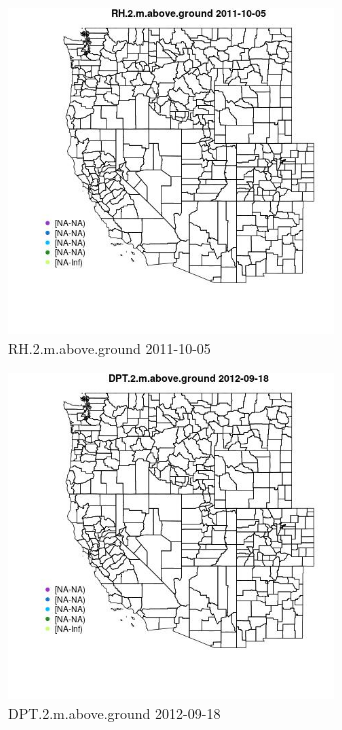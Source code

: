 \begin{figure} 
\centering  
\includegraphics[width=0.77\textwidth]{Code_Outputs/ML_input_report_ML_input_PM25_Step5_part_d_de_duplicated_aves_ML_input_MapObsRH2maboveground2011-10-05.jpg} 
\caption{\label{fig:ML_input_report_ML_input_PM25_Step5_part_d_de_duplicated_aves_ML_inputMapObsRH2maboveground2011-10-05}RH.2.m.above.ground 2011-10-05} 
\end{figure} 
 

\begin{figure} 
\centering  
\includegraphics[width=0.77\textwidth]{Code_Outputs/ML_input_report_ML_input_PM25_Step5_part_d_de_duplicated_aves_ML_input_MapObsDPT2maboveground2012-09-18.jpg} 
\caption{\label{fig:ML_input_report_ML_input_PM25_Step5_part_d_de_duplicated_aves_ML_inputMapObsDPT2maboveground2012-09-18}DPT.2.m.above.ground 2012-09-18} 
\end{figure} 
 

